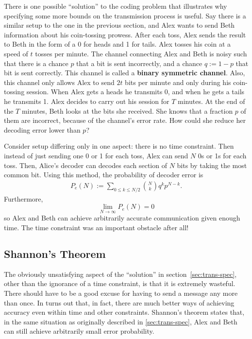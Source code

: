 \documentclass{article}
\renewcommand{\=}{\equiv}
\newcommand{\ra}{\rightarrow}
\theoremstyle{plain}
\theoremstyle{definition}
\begin{document}
There is one possible ``solution'' to the coding problem that illustrates why specifying some more bounds on the transmission process is useful.
Say there is a similar setup to the one in the previous section, and Alex wants to send Beth information about his coin-tossing prowess.
After each toss, Alex sends the result to Beth in the form of a 0 for heads and 1 for tails.
Alex tosses his coin at a speed of $t$ tosses per minute.
The channel connecting Alex and Beth is noisy such that there is a chance $p$ that a bit is sent incorrectly, and a chance $q := 1-p$  that bit is sent correctly.
This channel is called a \textbf{binary symmetric channel}.
Also, this channel only allows Alex to send $2t$ bits per minute and only during his coin-tossing session.
When Alex gets a heads he transmits 0, and when he gets a tails he transmits 1.
Alex decides to carry out his session for $T$ minutes.
At the end of the $T$ minutes, Beth looks at the bits she received.
She knows that a fraction $p$ of them are incorrect, because of the channel's error rate. How could she reduce her decoding error lower than $p$?

Consider setup differing only in one aspect: there is no time constraint.
Then instead of just sending one 0 or 1 for each toss, Alex can send $N$ 0s or 1s for each toss.
Then, Alice's decoder can decodes each section of $N$ bits by taking the most common bit.
Using this method, the probability of decoder error is
\begin{align}
  P_e(N) := \sum_{0 \leq k \leq N/2} \binom{N}{k} q^k p^{N-k}.
\end{align}
Furthermore,
$$ \lim_{N \ra \infty} P_e(N) = 0 $$
so Alex and Beth can achieve arbitrarily accurate communication given enough time.
The time constraint was an important obstacle after all!

\subsection{Shannon's Theorem}

The obviously unsatisfying aspect of the ``solution'' in section~\ref{sec:trans-spec}, other than the ignorance of a time constraint, is that it is extremely wasteful. There should have to be a good excuse for having to send a message any more than once.
In turns out that, in fact, there are much better ways of achieving accuracy even within time and other constraints.
Shannon's theorem states that, in the same situation as originally described in \ref{sec:trans-spec}, Alex and Beth can still achieve arbitrarily small error probability.
\end{document}
